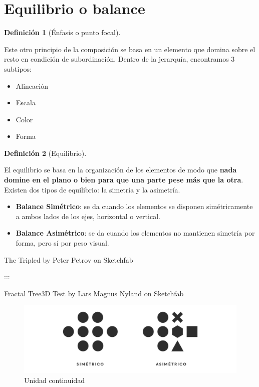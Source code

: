 \documentclass[
  16pt,
]{krantz}
\providecommand{\tightlist}{%
  \setlength{\itemsep}{0pt}\setlength{\parskip}{0pt}}
\theoremstyle{definition}
\newtheorem{definition}{Definición}[chapter]
\theoremstyle{definition}
\theoremstyle{definition}
\theoremstyle{definition}
\theoremstyle{remark}
\begin{document}
\hypertarget{equilibrio-o-balance}{%
\section{Equilibrio o balance}\label{equilibrio-o-balance}}

\begin{definition}[Énfasis o punto focal]
\protect\hypertarget{def:www}{}\label{def:www}

Este otro principio de la composición se basa en un elemento que domina sobre el resto en condición de subordinación. Dentro de la jerarquía, encontramos 3 subtipos:

\begin{itemize}
\tightlist
\item
  Alineación
\item
  Escala
\item
  Color
\item
  Forma
\end{itemize}

\end{definition}

\begin{definition}[Equilibrio]
\protect\hypertarget{def:wwwwwwwwwww}{}\label{def:wwwwwwwwwww}

El equilibrio se basa en la organización de los elementos de modo que \textbf{nada domine en el plano o bien para que una parte pese más que la otra}.
Existen dos tipos de equilibrio: la simetría y la asimetría.

\begin{itemize}
\tightlist
\item
  \textbf{Balance Simétrico}: se da cuando los elementos se disponen simétricamente a ambos lados de los ejes, horizontal o vertical.
\item
  \textbf{Balance Asimétrico}: se da cuando los elementos no mantienen simetría por forma, pero sí por peso visual.
\end{itemize}

\end{definition}

The Tripled by Peter Petrov on Sketchfab

:::

Fractal Tree3D Test by Lars Magnus Nyland on Sketchfab

\begin{figure}

{\centering \includegraphics[width=1\linewidth,height=1\textheight]{equilibrio} 

}

\caption{Unidad continuidad}\label{fig:equilibrio}
\end{figure}
\end{document}
